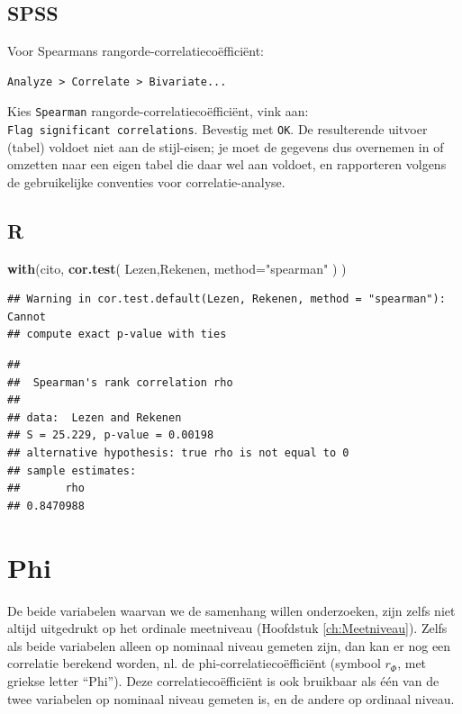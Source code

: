 \documentclass[
]{book}
\newenvironment{Shaded}{\begin{snugshade}}{\end{snugshade}}
\newcommand{\DataTypeTok}[1]{\textcolor[rgb]{0.13,0.29,0.53}{#1}}
\newcommand{\KeywordTok}[1]{\textcolor[rgb]{0.13,0.29,0.53}{\textbf{#1}}}
\newcommand{\NormalTok}[1]{#1}
\newcommand{\StringTok}[1]{\textcolor[rgb]{0.31,0.60,0.02}{#1}}
\begin{document}
\hypertarget{spss-7}{%
\subsection{SPSS}\label{spss-7}}

Voor Spearmans rangorde-correlatiecoëfficiënt:

\begin{verbatim}
Analyze > Correlate > Bivariate...
\end{verbatim}

Kies \texttt{Spearman} rangorde-correlatiecoëfficiënt, vink aan:
\texttt{Flag\ significant\ correlations}. Bevestig met \texttt{OK}. De resulterende
uitvoer (tabel) voldoet niet aan de stijl-eisen; je moet de gegevens dus
overnemen in of omzetten naar een eigen tabel die daar wel aan voldoet,
en rapporteren volgens de gebruikelijke conventies voor
correlatie-analyse.

\hypertarget{r-8}{%
\subsection{R}\label{r-8}}

\begin{Shaded}
\begin{Highlighting}[]
\KeywordTok{with}\NormalTok{(cito, }\KeywordTok{cor.test}\NormalTok{( Lezen,Rekenen, }\DataTypeTok{method=}\StringTok{"spearman"}\NormalTok{ ) )}
\end{Highlighting}
\end{Shaded}

\begin{verbatim}
## Warning in cor.test.default(Lezen, Rekenen, method = "spearman"): Cannot
## compute exact p-value with ties
\end{verbatim}

\begin{verbatim}
## 
##  Spearman's rank correlation rho
## 
## data:  Lezen and Rekenen
## S = 25.229, p-value = 0.00198
## alternative hypothesis: true rho is not equal to 0
## sample estimates:
##       rho 
## 0.8470988
\end{verbatim}

\hypertarget{sec:Phi}{%
\section{Phi}\label{sec:Phi}}

De beide variabelen waarvan we de samenhang willen onderzoeken, zijn
zelfs niet altijd uitgedrukt op het ordinale meetniveau
(Hoofdstuk \ref{ch:Meetniveau}). Zelfs als beide variabelen alleen op
nominaal niveau gemeten zijn, dan kan er nog een correlatie berekend
worden, nl. de phi-correlatiecoëfficiënt (symbool \(r_\Phi\), met griekse
letter ``Phi''). Deze correlatiecoëfficiënt is ook bruikbaar als één van
de twee variabelen op nominaal niveau gemeten is, en de andere op
ordinaal niveau.
\end{document}
